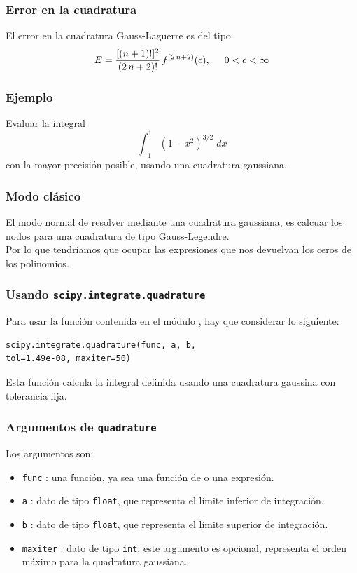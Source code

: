 \begin{frame}
\frametitle{Error en la cuadratura}
El error en la cuadratura Gauss-Laguerre es del tipo
\begin{align*}
E = \dfrac{[(n + 1)!]^{2}}{(2 \, n + 2)!} \, f^{(2 \, n + 2)} (c), \hspace{0.5cm} 0 < c < \infty
\end{align*}
\end{frame}
\begin{frame}
\frametitle{Ejemplo}
Evaluar la integral
\[ \int_{-1}^{1} (1 - x^{2})^{3/2} \; dx \]
con la mayor precisión posible, usando una cuadratura gaussiana.
\end{frame}
\begin{frame}
\frametitle{Modo clásico}
El modo normal de resolver mediante una cuadratura gaussiana, es calcuar los nodos para una cuadratura de tipo Gauss-Legendre.
\\
\bigskip
Por lo que tendríamos que ocupar las expresiones que nos devuelvan los ceros de los polinomios. 
\end{frame}
\begin{frame}[fragile]
\frametitle{Usando \texttt{scipy.integrate.quadrature}}
Para usar la función  contenida en el módulo , hay que considerar lo siguiente:
\begin{verbatim}
scipy.integrate.quadrature(func, a, b, 
tol=1.49e-08, maxiter=50)
\end{verbatim}
\pause
Esta función calcula la integral definida usando una cuadratura gaussina con tolerancia fija.
\end{frame}
\begin{frame}
\frametitle{Argumentos de \texttt{quadrature}}
Los argumentos son:
\begin{itemize}
\item \texttt{func} : una función, ya sea una función de \python{} o una expresión.
\item \texttt{a} : dato de tipo \texttt{float}, que representa el límite inferior de integración.
\item \texttt{b} : dato de tipo \texttt{float}, que representa el límite superior de integración.
\item \texttt{maxiter} : dato de tipo \texttt{int}, este argumento es opcional, representa el orden máximo para la quadratura gaussiana.
\end{itemize}
\end{frame}

